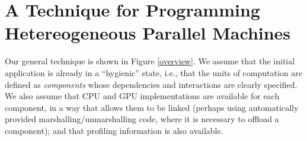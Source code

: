 \documentclass[smallextended]{svjour3}
\begin{document}
\section{A Technique for Programming Hetereogeneous Parallel Machines} \label{sec:methodology}
\noindent
Our general technique is shown in Figure \ref{overview}.  We assume that the initial application
is already in a ``hygienic'' state, i.e., that the
units of computation are defined as \emph{components} whose dependencies and interactions are clearly specified.
We also assume that CPU and GPU implementations are available for each component, in a way that allows them
to be linked (perhaps using automatically provided marshalling/unmarshalling code, where it is necessary to
offload a component); and that profiling information is also available.
\end{document}
